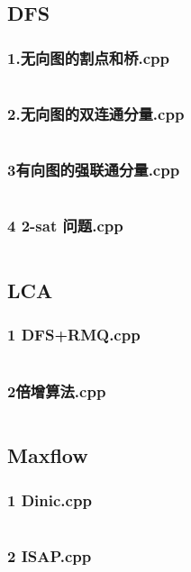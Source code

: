 \documentclass[a4paper,11pt]{article}
\begin{document}
\subsection{DFS}
\subsubsection{1.无向图的割点和桥.cpp}
\inputminted{c++}{"D:/tmplz/templates/图论/DFS/1.无向图的割点和桥.cpp"}
\subsubsection{2.无向图的双连通分量.cpp}
\inputminted{c++}{"D:/tmplz/templates/图论/DFS/2.无向图的双连通分量.cpp"}
\subsubsection{3有向图的强联通分量.cpp}
\inputminted{c++}{"D:/tmplz/templates/图论/DFS/3有向图的强联通分量.cpp"}
\subsubsection{4 2-sat 问题.cpp}
\inputminted{c++}{"D:/tmplz/templates/图论/DFS/4 2-sat 问题.cpp"}
\subsection{LCA}
\subsubsection{1 DFS+RMQ.cpp}
\inputminted{c++}{"D:/tmplz/templates/图论/LCA/1 DFS+RMQ.cpp"}
\subsubsection{2倍增算法.cpp}
\inputminted{c++}{"D:/tmplz/templates/图论/LCA/2倍增算法.cpp"}
\subsection{Maxflow}
\subsubsection{1 Dinic.cpp}
\inputminted{c++}{"D:/tmplz/templates/图论/Maxflow/1 Dinic.cpp"}
\subsubsection{2 ISAP.cpp}
\inputminted{c++}{"D:/tmplz/templates/图论/Maxflow/2 ISAP.cpp"}
\end{document}
